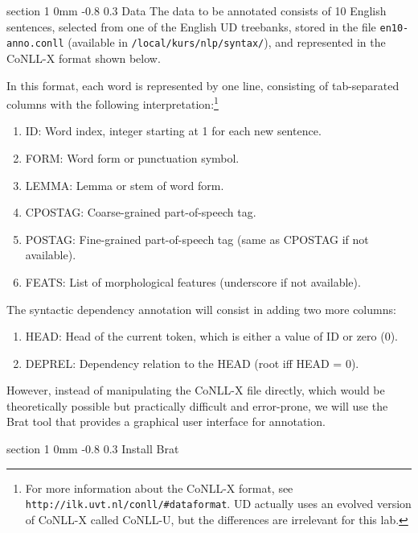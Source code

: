 \documentclass[10.9pt]{article}
\makeatletter
\newcommand{\newsec}[2]{\section{#1}\label{sec:#2}\noindent}
\renewcommand{\section}{\@startsection
{section}%
{1}%
{0mm}%
{-0.8\baselineskip}%
{0.3\baselineskip}%
{\bfseries\large}}%
\makeatother
\begin{document}
\newsec{Data}{data}%
The data to be annotated consists of 10 English sentences, selected from one of the English UD treebanks, stored in the file {\tt en10-anno.conll} 
(available in {\tt /local/kurs/nlp/syntax/}), and represented in the CoNLL-X format shown below.
\begin{center}
\fbox{

}
\end{center}
In this format, each word is represented by one line, consisting of tab-separated columns with the following interpretation:\footnote{For more information about the CoNLL-X format, see {\tt http://ilk.uvt.nl/conll/\#dataformat}. UD actually uses an evolved version of CoNLL-X called CoNLL-U, but the differences are irrelevant for this lab.} 
\begin{enumerate}[topsep=5pt,noitemsep]
\item ID: Word index, integer starting at 1 for each new sentence.
\item FORM: Word form or punctuation symbol.
\item LEMMA: Lemma or stem of word form.
\item CPOSTAG: Coarse-grained part-of-speech tag.
\item POSTAG: Fine-grained part-of-speech tag (same as CPOSTAG if not available).
\item FEATS: List of morphological features (underscore if not available).
\end{enumerate}
The syntactic dependency annotation will consist in adding two more columns:
\begin{enumerate}[topsep=5pt,noitemsep]
\item HEAD: Head of the current token, which is either a value of ID or zero (0).
\item DEPREL: Dependency relation to the HEAD (root iff HEAD = 0).
\end{enumerate}
However, instead of manipulating the CoNLL-X file directly, which would be theoretically possible but practically difficult and error-prone, we will use the Brat tool 
that provides a graphical user interface for annotation. 

\newsec{Install Brat}{brat}%
\end{document}
